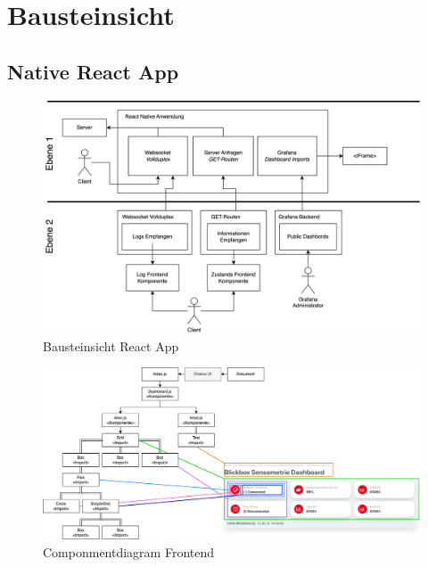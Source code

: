 \documentclass[
]{article}
\begin{document}
\section{Bausteinsicht}

\subsection{Native React App}
\begin{figure}[htbp]
	\centering
	\includegraphics[width=160mm]{resources/BausteinsichtValentin.drawio.png}
	\caption{Bausteinsicht React App}
	\label{fig:BausteinFrontend}
\end{figure}  

\begin{figure}[htbp]
	\centering
	\includegraphics[width=160mm]{resources/fecomponentsdiagr.drawio.png}
	\caption{Componmentdiagram Frontend}
	\label{fig:CPFrontent}
\end{figure}  
\end{document}
